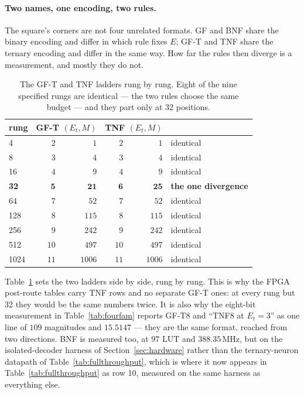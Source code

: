 \documentclass[11pt]{article}
\theoremstyle{definition}
\begin{document}
\paragraph{Two names, one encoding, two rules.} The square's corners are not
four unrelated formats. GF and BNF share the binary encoding and differ in which
rule fixes $E$; GF-T and TNF share the ternary encoding and differ in the same
way. How far the rules then diverge is a measurement, and mostly they do not.

\begin{table}[t]\centering
\caption{The GF-T and TNF ladders rung by rung. Eight of the nine specified
rungs are identical --- the two rules choose the same budget --- and they part
only at 32 positions.}
\label{tab:gftvstnf}
\begin{tabular}{lrrrrl}
\toprule
rung & \multicolumn{2}{c}{GF-T $(E_t, M)$} & \multicolumn{2}{c}{TNF $(E_t, M)$} & \\
\midrule
4    & $2$ & $1$    & $2$ & $1$    & identical \\
8    & $3$ & $4$    & $3$ & $4$    & identical \\
16   & $4$ & $9$    & $4$ & $9$    & identical \\
\textbf{32} & $\mathbf{5}$ & $\mathbf{21}$ & $\mathbf{6}$ & $\mathbf{25}$ & \textbf{the one divergence} \\
64   & $7$ & $52$   & $7$ & $52$   & identical \\
128  & $8$ & $115$  & $8$ & $115$  & identical \\
256  & $9$ & $242$  & $9$ & $242$  & identical \\
512  & $10$ & $497$ & $10$ & $497$ & identical \\
1024 & $11$ & $1006$& $11$ & $1006$& identical \\
\bottomrule
\end{tabular}
\end{table}

Table~\ref{tab:gftvstnf} sets the two ladders side by side, rung by rung. This is
why the FPGA post-route tables carry TNF rows and no separate GF-T ones: at
every rung but 32 they would be the same numbers twice. It is also why the
eight-bit measurement in Table~\ref{tab:fourfam} reports GF-T8 and ``TNF8 at
$E_t=3$'' as one line
of $109$ magnitudes and $15.5147$ --- they are the same format, reached from two
directions. BNF is measured too, at $97$ LUT and $388.35$\,MHz, but on the
isolated-decoder harness of Section~\ref{sec:hardware} rather than the
ternary-neuron datapath of Table~\ref{tab:fullthroughput}, which is where
it now appears in Table~\ref{tab:fullthroughput} as row 10, measured on the
same harness as everything else.
\end{document}

